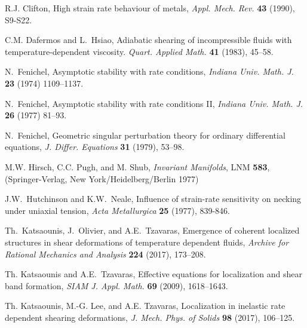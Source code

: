\documentclass[a4paper,11pt]{article}
\theoremstyle{remark}
\begin{document}
\begin{thebibliography}{10}
{\sc R.J. Clifton},  High strain rate behaviour of metals,
{\it Appl. Mech. Rev.}
{\bf 43} (1990), S9-S22.

{\sc C.M. Dafermos and L.~Hsiao},
Adiabatic shearing of incompressible fluids with temperature-dependent viscosity.
{\it Quart.  Applied Math.} {\bf 41} (1983), 45--58.


{\sc N.~Fenichel},
Asymptotic stability with rate conditions,
{\it Indiana Univ. Math. J.} {\bf 23} (1974) 1109--1137.

{\sc N.~Fenichel},
Asymptotic stability with rate conditions \textrm{II},
{\it Indiana Univ. Math. J.} {\bf 26} (1977) 81--93.

{\sc N.~Fenichel},
Geometric singular perturbation theory for ordinary differential equations,
{\it J. Differ. Equations} {\bf 31} (1979), 53--98.


{\sc M.W. Hirsch, C.C. Pugh, and M. Shub},
{\it Invariant Manifolds}, LNM {\bf 583}, (Springer-Verlag, New York/Heidelberg/Berlin 1977)

{\sc J.W.~Hutchinson and K.W.~Neale},
Influence of strain-rate sensitivity on necking under uniaxial tension,
{\it  Acta Metallurgica} {\bf 25} (1977), 839-846.

{\sc Th.~Katsaounis, J.~Olivier, and A.E.~Tzavaras},
Emergence of coherent localized structures in shear deformations of temperature dependent fluids,
{\it Archive for Rational Mechanics and Analysis} {\bf 224} (2017), 173--208.

{\sc Th. Katsaounis and A.E.~Tzavaras},
Effective equations for localization and shear band formation,
{\it SIAM J. Appl. Math.}  {\bf 69} (2009), 1618--1643.

{\sc Th. Katsaounis, M.-G. Lee, and A.E. Tzavaras},
Localization in inelastic rate dependent shearing deformations,
{\it J. Mech. Phys. of Solids} {\bf 98} (2017), 106--125.


\end{thebibliography}
\end{document}

